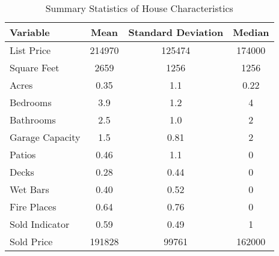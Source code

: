 \documentclass[12pt]{article}
\begin{document}
\begin{table}[ht]
    \centering
    \caption{Summary Statistics of House Characteristics}
    \begin{tabular}{@{}lccc@{}} \toprule
        Variable        & Mean      & Standard Deviation    & Median \\ \midrule
        List Price      & 214970    & 125474                & 174000 \\
        Square Feet     & 2659      & 1256                  & 1256 \\
        Acres           & 0.35      & 1.1                   & 0.22 \\
        Bedrooms        & 3.9       & 1.2                   & 4 \\
        Bathrooms       & 2.5       & 1.0                   & 2 \\
        Garage Capacity & 1.5       & 0.81                  & 2 \\
        Patios          & 0.46      & 1.1                   & 0 \\
        Decks           & 0.28      & 0.44                  & 0 \\
        Wet Bars        & 0.40      & 0.52                  & 0 \\
        Fire Places     & 0.64      & 0.76                  & 0 \\
        Sold Indicator  & 0.59      & 0.49                  & 1 \\
        Sold Price      & 191828    & 99761                 & 162000 \\ \bottomrule
    \end{tabular}
\end{table}
        
\end{document}

